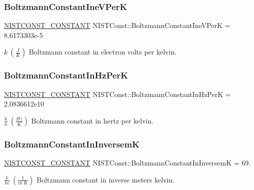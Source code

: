 \subsubsection{\texorpdfstring{Boltzmann\+Constant\+Ine\+V\+PerK}{BoltzmannConstantIneVPerK}}
{\footnotesize\ttfamily \mbox{\hyperlink{group___n_i_s_t_const-_macros_ga2b0fc1d7452373f816175dd86ce26729}{N\+I\+S\+T\+C\+O\+N\+S\+T\+\_\+\+C\+O\+N\+S\+T\+A\+NT}} N\+I\+S\+T\+Const\+::\+Boltzmann\+Constant\+Ine\+V\+PerK = 8.\+6173303e-\/5}

$k \ (\frac{J}{K})$ Boltzmann constant in electron volts per kelvin. \mbox{\label{group___n_i_s_t_const-_boltzmann_constant_gae7c3bd9c33c056465e2fe1e8e6f5bbd2}} 
\subsubsection{\texorpdfstring{Boltzmann\+Constant\+In\+Hz\+PerK}{BoltzmannConstantInHzPerK}}
{\footnotesize\ttfamily \mbox{\hyperlink{group___n_i_s_t_const-_macros_ga2b0fc1d7452373f816175dd86ce26729}{N\+I\+S\+T\+C\+O\+N\+S\+T\+\_\+\+C\+O\+N\+S\+T\+A\+NT}} N\+I\+S\+T\+Const\+::\+Boltzmann\+Constant\+In\+Hz\+PerK = 2.\+0836612e10}

$\frac{k}{h} \ (\frac{Hz}{K})$ Boltzmann constant in hertz per kelvin. \mbox{\label{group___n_i_s_t_const-_boltzmann_constant_ga03a6526c1016d67e765abded43b37f36}} 
\subsubsection{\texorpdfstring{Boltzmann\+Constant\+In\+InversemK}{BoltzmannConstantInInversemK}}
{\footnotesize\ttfamily \mbox{\hyperlink{group___n_i_s_t_const-_macros_ga2b0fc1d7452373f816175dd86ce26729}{N\+I\+S\+T\+C\+O\+N\+S\+T\+\_\+\+C\+O\+N\+S\+T\+A\+NT}} N\+I\+S\+T\+Const\+::\+Boltzmann\+Constant\+In\+InversemK = 69.}

$\frac{k}{h c} \ (\frac{1}{m\ K})$ Boltzmann constant in inverse meters kelvin. \mbox{\label{group___n_i_s_t_const-_boltzmann_constant_gad380fd5e3ca97fb5fc7a473a82789b82}} 
